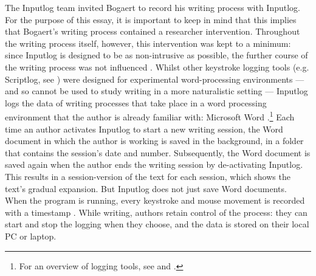 \begin{paper}
The Inputlog team invited Bogaert to record his writing process with
Inputlog. For the purpose of this essay, it is important to keep in mind
that this implies that Bogaert's writing process contained a
researcher intervention. Throughout the writing process itself, however,
this intervention was kept to a minimum: since Inputlog is designed to
be as non-intrusive as possible, the further course of the writing
process was not influenced \citep{leijten_keystroke_2013}. Whilst other
keystroke logging tools (e.g. Scriptlog, see \citealt{wengelin_combined_2009}) were
designed for experimental word-processing environments --- and so cannot
be used to study writing in a more naturalistic setting --- Inputlog logs
the data of writing processes that take place in a word processing
environment that the author is already familiar with: Microsoft Word \citep{leijten_keystroke_2013}.\footnote{For an overview of logging tools,
  see \citealt{van_waes_logging_2011} and \citealt{lindgren_researching_2019}.} Each
time an author activates Inputlog to start a new writing session, the
Word document in which the author is working is saved in the background,
in a folder that contains the session's date and number. Subsequently,
the Word document is saved again when the author ends the writing
session by de-activating Inputlog. This results in a session-version of
the text for each session, which shows the text's gradual expansion. But
Inputlog does not just save Word documents. When the program is running,
every keystroke and mouse movement is recorded with a timestamp \citep{leijten_keystroke_2013}. While writing, authors retain control of the
process: they can start and stop the logging when they choose, and the
data is stored on their local PC or laptop.


\end{paper}
